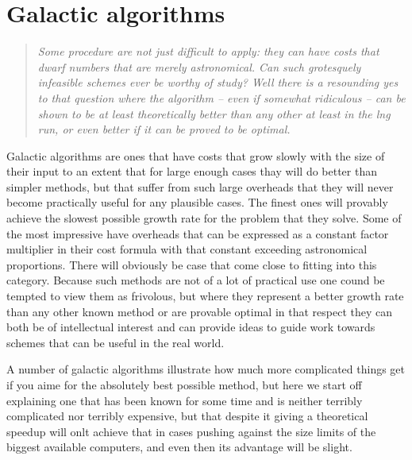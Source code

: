 \section{Galactic algorithms}
\begin{quotation}\textit{
Some procedure are not just difficult to apply: they can have costs that
dwarf numbers that are merely astronomical. Can such grotesquely infeasible
schemes ever be worthy of study? Well there is a resounding yes to that
question where the algorithm -- even if somewhat ridiculous -- can be
shown to be at least theoretically better than any other at least in the
lng run, or even better if it can be proved to be optimal. 
}\end{quotation}
Galactic algorithms are ones that have costs that grow slowly with the
size of their input to an extent that for large enough cases thay will
do better than simpler methods, but that suffer from such large
overheads that they will never become practically useful for any
plausible cases. The finest ones will provably achieve the slowest
possible growth rate for the problem that they solve. Some of the
most impressive have overheads that can be expressed as a constant factor
multiplier in their cost formula with that constant exceeding astronomical
proportions. There will obviously be case that come close to fitting into
this category. Because such methods are not of a lot of practical use one
cound be tempted to view them as frivolous, but where they represent
a better growth rate than any other known method or are provable optimal
in that respect they can both be of intellectual interest and can provide
ideas to guide work towards schemes that can be useful in the real world.

A number of galactic algorithms illustrate how much more complicated
things get if you aime for the absolutely best possible method, but
here we start off explaining one that has been known for some time
and is neither terribly complicated nor terribly expensive, but that
despite it giving a theoretical speedup will onlt achieve that in cases
pushing against the size limits of the biggest available computers, and
even then its advantage will be slight.

